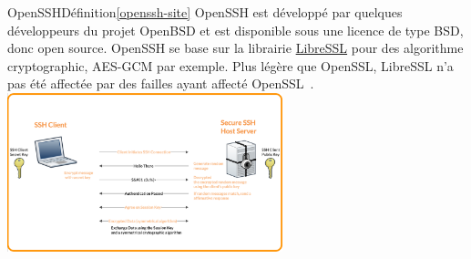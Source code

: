 \documentclass{beamer}
\begin{document}
    \begin{frame}{OpenSSH}{Définition\cref{openssh-site}}
        OpenSSH est développé par quelques développeurs du projet OpenBSD et est disponible sous une licence de type BSD, donc open source.
        \bigbreak
        OpenSSH se base sur la librairie \href{https://www.libressl.org}{LibreSSL} pour des algorithme cryptographic, AES-GCM par exemple.
        Plus légère que OpenSSL, LibreSSL n'a pas été affectée par des failles ayant affecté OpenSSL~.
        \bigbreak
        \centering
        \includegraphics[width=8cm]{image/ssh-key-diagram}
    \end{frame}
\end{document}
